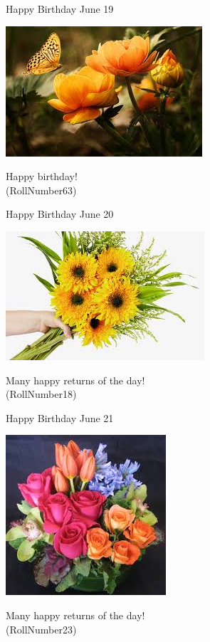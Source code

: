 \documentclass[table, landscape]{beamer}
\begin{document}
\begin{frame}{\color{red}Happy Birthday }
{June 19}
\begin{center}
\includegraphics[height=0.5\textheight]{flowers/f7.jpeg}

Happy birthday! \\ \vspace{0.5cm}{\Large name56} (RollNumber63)
\end{center}
\end{frame}
\begin{frame}{\color{blue}Happy Birthday }
{June 20}
\begin{center}
\includegraphics[height=0.5\textheight]{flowers/f6.jpeg}

Many happy returns of the day! \\ \vspace{0.5cm}{\Large name13} (RollNumber18)
\end{center}
\end{frame}
\begin{frame}{\color{blue}Happy Birthday }
{June 21}
\begin{center}
\includegraphics[height=0.5\textheight]{flowers/f9.jpeg}

Many happy returns of the day! \\ \vspace{0.5cm}{\Large name18} (RollNumber23)
\end{center}
\end{frame}
\end{document}
